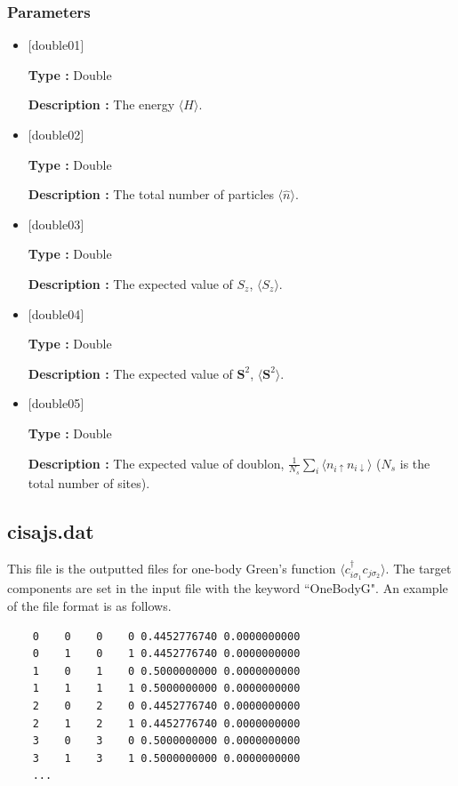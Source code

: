 \subsubsection{Parameters}
 \begin{itemize}

  \item  $[$double01$]$
  
 {\bf Type :} Double

{\bf Description :} The energy $\langle H\rangle$. 
 
  \item $[$double02$]$

 {\bf Type :} Double 

{\bf Description :}  The total number of particles $\langle \hat{n}\rangle$.

  \item $[$double03$]$

 {\bf Type :} Double 

{\bf Description :}  The expected value of $S_z$, $\langle S_z\rangle$. 

  \item $[$double04$]$

 {\bf Type :} Double 

{\bf Description :}  The expected value of ${\bm S^2}$, $\langle {\bm S^2}\rangle$. 

  \item $[$double05$]$

 {\bf Type :} Double 

{\bf Description :}  The expected value of doublon, 
$\frac{1}{N_s} \sum_{i}\langle n_{i\uparrow}n_{i\downarrow}\rangle$ ($N_{s}$ is the total number of sites).


 \end{itemize}

\newpage
\subsection{cisajs.dat}
\label{Subsec:cgcisajs}
This file is the outputted files for one-body Green's function $\langle c_{i\sigma_1}^{\dagger}c_{j\sigma_2}\rangle$. 
The target components are set in the input file with the keyword ``OneBodyG".
An example of the file format is as follows.

\begin{minipage}{12.5cm}
\begin{screen}
\begin{verbatim}
    0    0    0    0 0.4452776740 0.0000000000
    0    1    0    1 0.4452776740 0.0000000000
    1    0    1    0 0.5000000000 0.0000000000
    1    1    1    1 0.5000000000 0.0000000000
    2    0    2    0 0.4452776740 0.0000000000
    2    1    2    1 0.4452776740 0.0000000000
    3    0    3    0 0.5000000000 0.0000000000
    3    1    3    1 0.5000000000 0.0000000000
    ...
\end{verbatim}
\end{screen}
\end{minipage}

